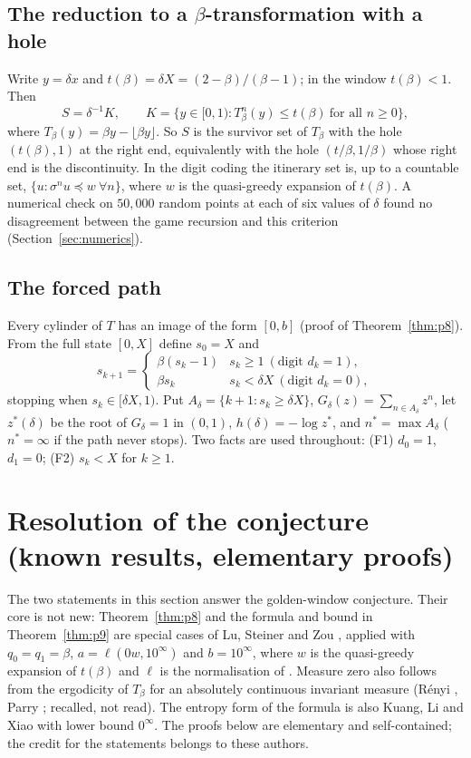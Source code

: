 \documentclass[11pt]{amsart}
\theoremstyle{remark}
\newcommand{\lex}{\preccurlyeq}
\begin{document}
\subsection{\texorpdfstring{The reduction to a $\beta$-transformation with a hole}{The reduction to a beta-transformation with a hole}}
Write $y=\delta x$ and $t(\beta)=\delta X=(2-\beta)/(\beta-1)$; in the window $t(\beta)<1$. Then
\[
S=\delta^{-1}K,\qquad K=\{y\in[0,1): T_\beta^n(y)\le t(\beta)\ \text{for all } n\ge0\},
\]
where $T_\beta(y)=\beta y-\lfloor\beta y\rfloor$. So $S$ is the survivor set of $T_\beta$ with the hole $(t(\beta),1)$ at the right end, equivalently with the hole $(t/\beta,1/\beta)$ whose right end is the discontinuity. In the digit coding the itinerary set is, up to a countable set, $\{u:\sigma^n u\lex w\ \forall n\}$, where $w$ is the quasi-greedy expansion of $t(\beta)$. A numerical check on $50{,}000$ random points at each of six values of $\delta$ found no disagreement between the game recursion and this criterion (Section~\ref{sec:numerics}).

\subsection{The forced path}
Every cylinder of $T$ has an image of the form $[0,b]$ (proof of Theorem~\ref{thm:p8}). From the full state $[0,X]$ define $s_0=X$ and
\[
s_{k+1}=\begin{cases}\beta(s_k-1)& s_k\ge1 \ (\text{digit } d_k=1),\\ \beta s_k & s_k<\delta X\ (\text{digit } d_k=0),\end{cases}
\]
stopping when $s_k\in[\delta X,1)$. Put $A_\delta=\{k+1:s_k\ge\delta X\}$, $G_\delta(z)=\sum_{n\in A_\delta}z^n$, let $z^*(\delta)$ be the root of $G_\delta=1$ in $(0,1)$, $h(\delta)=-\log z^*$, and $n^*=\max A_\delta$ ($n^*=\infty$ if the path never stops). Two facts are used throughout: (F1) $d_0=1$, $d_1=0$; (F2) $s_k<X$ for $k\ge1$.

\section{Resolution of the conjecture (known results, elementary proofs)}\label{sec:resolution}

The two statements in this section answer the golden-window conjecture. Their core is not new: Theorem~\ref{thm:p8} and the formula and bound in Theorem~\ref{thm:p9} are special cases of Lu, Steiner and Zou \cite[Theorem~1.2 with Lemma~2.7, and Proposition~2.5]{LSZ}, applied with $q_0=q_1=\beta$, $a=\ell(0w,10^\infty)$ and $b=10^\infty$, where $w$ is the quasi-greedy expansion of $t(\beta)$ and $\ell$ is the normalisation of \cite[Lemma~2.7]{LSZ}. Measure zero also follows from the ergodicity of $T_\beta$ for an absolutely continuous invariant measure (R\'enyi \cite{Renyi}, Parry \cite{Parry}; recalled, not read). The entropy form of the formula is also Kuang, Li and Xiao \cite[Theorem~4.3]{KLX} with lower bound $0^\infty$. The proofs below are elementary and self-contained; the credit for the statements belongs to these authors.
\end{document}
